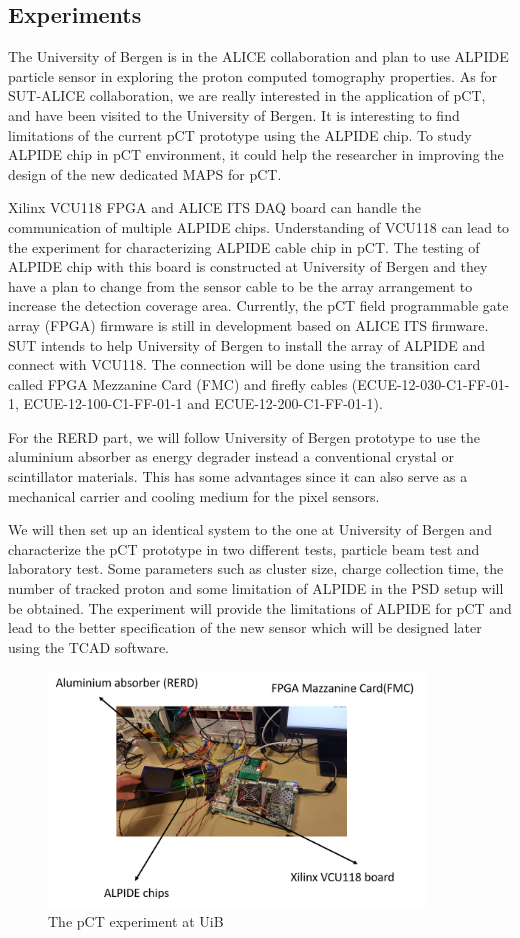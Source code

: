 \documentclass[12pt,a4paper]{article}
\begin{document}
\subsection{Experiments}

The University of Bergen is in the ALICE collaboration and  plan to use ALPIDE particle sensor in exploring the proton computed tomography properties. As  for SUT-ALICE collaboration, we are really interested in the application of pCT, and have been visited to the University of Bergen. It is interesting to find limitations of the current pCT prototype using the ALPIDE chip. To study ALPIDE chip in pCT environment, it could help the researcher in improving the design of the new dedicated MAPS  for pCT.

Xilinx VCU118 FPGA and ALICE ITS DAQ board can handle the communication of  multiple ALPIDE chips. Understanding of VCU118 can lead to the experiment for characterizing ALPIDE cable chip in pCT. The testing of ALPIDE chip with this board is constructed at University of Bergen and they have a plan to change from the sensor cable to be the array arrangement to increase the detection coverage area. Currently, the pCT  field programmable gate array (FPGA) firmware is still in development based on ALICE ITS firmware. SUT intends to help University of Bergen to install the array of ALPIDE  and  connect with VCU118.  The connection will be done using the transition card called FPGA Mezzanine Card (FMC) and firefly cables (ECUE-12-030-C1-FF-01-1, 
ECUE-12-100-C1-FF-01-1 and ECUE-12-200-C1-FF-01-1). 

For the RERD part, we will follow University of Bergen prototype to use the aluminium absorber as energy degrader instead a conventional crystal or   scintillator materials. This has some advantages since it can also serve as a mechanical carrier and cooling medium for the pixel sensors.

We will then set up an identical system to the one at University of Bergen and characterize the pCT prototype in two different tests, particle beam test and laboratory test.  Some parameters such as  cluster size, charge collection time, the number of tracked proton and some limitation of ALPIDE in the PSD setup will be obtained. The experiment will provide the limitations of ALPIDE for pCT and lead to the better specification of the new sensor which will be designed later using the TCAD software.  

\begin{figure}[hbt]
\centering
  \includegraphics[width=10cm]{figure/PCTBergen.png}
  \caption{The pCT experiment at UiB}
  \label{fig:pCT}
\end{figure}
\end{document}
